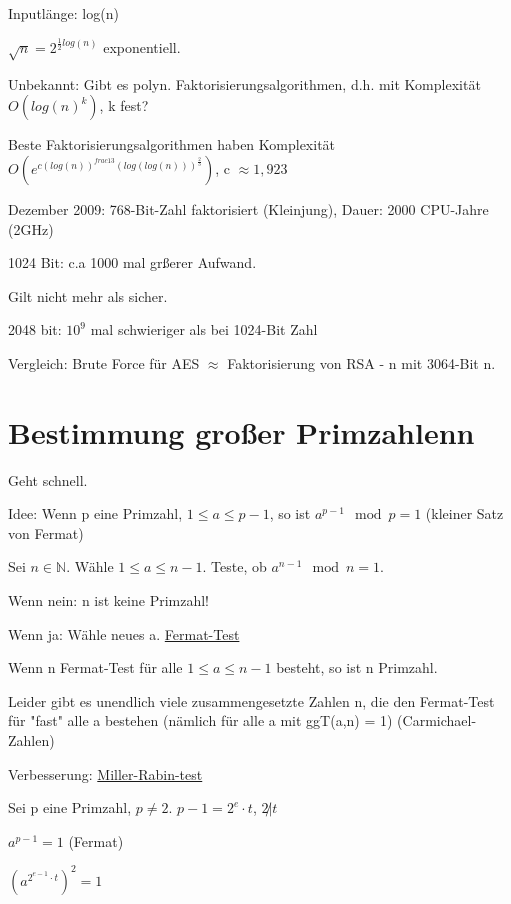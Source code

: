 \begin{enumerate}[label=(\alph*)]
  Inputlänge: log(n) 

  $\sqrt{n} = 2^{\frac{1}{2} log(n)}$ exponentiell. 

  Unbekannt: Gibt es polyn. Faktorisierungsalgorithmen, d.h. mit Komplexität $O(log(n)^k)$, k fest? 

  \par \medskip

  Beste Faktorisierungsalgorithmen haben Komplexität $O(e^{c(log (n))^{frac{1}{3}} (log(log(n)))^{\frac{2}{3}}})$, c $\approx 1,923$

  Dezember 2009: 768-Bit-Zahl faktorisiert (Kleinjung), Dauer: 2000 CPU-Jahre (2GHz)

  1024 Bit: c.a 1000 mal grßerer Aufwand.

  \par \medskip
  
  Gilt nicht mehr als sicher.

  \par \medskip
   
  2048 bit: $10^9$ mal schwieriger als bei 1024-Bit Zahl

  Vergleich: Brute Force für AES $\approx$ Faktorisierung von RSA - n mit 3064-Bit n.
\end{enumerate}
  \section{Bestimmung großer Primzahlenn}
  Geht schnell.  

  Idee: Wenn p eine Primzahl, $1 \le a \le p-1$, so ist $a^{p-1} \mod p = 1$ (kleiner Satz von Fermat)

  Sei $n \in \mathbb{N}$. Wähle $1 \le a \le n-1$. Teste, ob $a^{n-1} \mod n = 1$.

  Wenn nein: n ist keine Primzahl!

  Wenn ja: Wähle neues a.  \underline{Fermat-Test}
  
  Wenn n Fermat-Test für alle $1 \le a \le n-1$ besteht, so ist n Primzahl.

  Leider gibt es unendlich viele zusammengesetzte Zahlen n, die den Fermat-Test für "fast" alle a bestehen (nämlich für alle a mit ggT(a,n) = 1) (Carmichael-Zahlen)

  Verbesserung: \underline{Miller-Rabin-test}

  Sei p eine Primzahl, $p \neq 2$. $p-1= 2^e \cdot t$, $2 \not | t$

  $a^{p-1} = 1$  (Fermat)

  $(a^{2^{e-1} \cdot t})^2 = 1$

